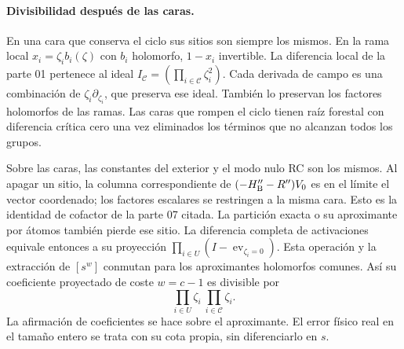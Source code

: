 \paragraph{Divisibilidad después de las caras.}
En una cara que conserva el ciclo sus sitios son siempre los mismos.
En la rama local $x_i=\zeta_i b_i(\zeta)$ con $b_i$ holomorfo, $1-x_i$ invertible.
La diferencia local de la parte 01 pertenece al ideal
$I_{\mathcal C}=(\prod_{i\in\mathcal C}\zeta_i^2)$. Cada derivada de campo es
una combinación de $\zeta_i\partial_{\zeta_i}$, que preserva ese ideal.
También lo preservan los factores holomorfos de las ramas. Las caras que rompen
el ciclo tienen raíz forestal con diferencia crítica cero una vez eliminados
los términos que no alcanzan todos los grupos.

Sobre las caras, las constantes del exterior y el modo nulo RC son los mismos.
Al apagar un sitio, la columna correspondiente de $(-H_{\rm B}''-R'')V_0$
es en el límite el vector coordenado; los factores escalares se restringen a
la misma cara. Esto es la identidad de cofactor de la parte 07 citada.
La partición exacta o su aproximante por átomos también pierde ese sitio.
La diferencia completa de activaciones equivale entonces a su proyección
$\prod_{i\in U}(I-\operatorname{ev}_{\zeta_i=0})$. Esta operación
y la extracción de $[s^w]$ conmutan para los aproximantes holomorfos comunes.
Así su coeficiente proyectado de coste $w=c-1$ es divisible por
\[
                 \prod_{i\in U}\zeta_i\ \prod_{i\in\mathcal C}\zeta_i .
\]
La afirmación de coeficientes se hace sobre el aproximante. El error físico real
en el tamaño entero se trata con su cota propia, sin diferenciarlo en $s$.
